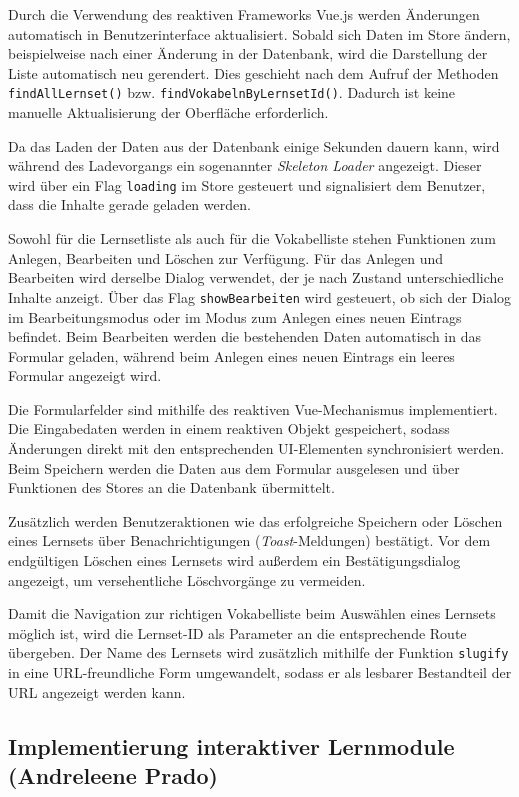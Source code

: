 Durch die Verwendung des reaktiven Frameworks Vue.js werden Änderungen automatisch in Benutzerinterface aktualisiert.
Sobald sich Daten im Store ändern, beispielweise nach einer Änderung in der Datenbank, wird die Darstellung der Liste automatisch neu gerendert.
Dies geschieht nach dem Aufruf der Methoden \texttt{findAllLernset()} bzw. \texttt{findVokabelnByLernsetId()}.
Dadurch ist keine manuelle Aktualisierung der Oberfläche erforderlich.

Da das Laden der Daten aus der Datenbank einige Sekunden dauern kann, wird während des Ladevorgangs ein sogenannter \textit{Skeleton Loader} angezeigt.
Dieser wird über ein Flag \texttt{loading} im Store gesteuert und signalisiert dem Benutzer, dass die Inhalte gerade geladen werden.

Sowohl für die Lernsetliste als auch für die Vokabelliste stehen Funktionen zum Anlegen, Bearbeiten und Löschen zur Verfügung.
Für das Anlegen und Bearbeiten wird derselbe Dialog verwendet, der je nach Zustand unterschiedliche Inhalte anzeigt.
Über das Flag \texttt{showBearbeiten} wird gesteuert, ob sich der Dialog im Bearbeitungsmodus oder im Modus zum Anlegen eines neuen Eintrags befindet.
Beim Bearbeiten werden die bestehenden Daten automatisch in das Formular geladen, während beim Anlegen eines neuen Eintrags ein leeres Formular angezeigt wird.

Die Formularfelder sind mithilfe des reaktiven Vue-Mechanismus implementiert.
Die Eingabedaten werden in einem reaktiven Objekt gespeichert, sodass Änderungen direkt mit den entsprechenden UI-Elementen synchronisiert werden.
Beim Speichern werden die Daten aus dem Formular ausgelesen und über Funktionen des Stores an die Datenbank übermittelt.

Zusätzlich werden Benutzeraktionen wie das erfolgreiche Speichern oder Löschen eines Lernsets über Benachrichtigungen (\textit{Toast}-Meldungen) bestätigt.
Vor dem endgültigen Löschen eines Lernsets wird außerdem ein Bestätigungsdialog angezeigt, um versehentliche Löschvorgänge zu vermeiden.

Damit die Navigation zur richtigen Vokabelliste beim Auswählen eines Lernsets möglich ist, wird die Lernset-ID als Parameter an die entsprechende Route übergeben.
Der Name des Lernsets wird zusätzlich mithilfe der Funktion \texttt{slugify} in eine URL-freundliche Form umgewandelt, sodass er als lesbarer Bestandteil der URL angezeigt werden kann.

\subsection{Implementierung interaktiver Lernmodule (Andreleene Prado)}

